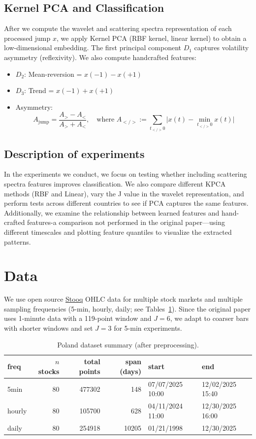 \documentclass[11pt,a4paper]{article}
\begin{document}
\subsection{Kernel PCA and Classification}

After we compute the wavelet and scattering spectra representation of each processed jump $x$, we apply Kernel PCA (RBF kernel, linear kernel) to obtain a low-dimensional embedding. The first principal component $D_1$ captures volatility asymmetry (reflexivity). We also compute handcrafted features:
\begin{itemize}
    \item $D_2$: Mean-reversion = $x(-1) - x(+1)$
    \item $D_3$: Trend = $x(-1) + x(+1)$
    \item Asymmetry: \[
A_{\text{jump}} = \frac{A_> - A_<}{A_> + A_<}, \quad 
\text{where } A_{</>} := \sum_{t_{</>}0} \big| x(t) - \min_{t_{</>}0} x(t) \big|
\]
\end{itemize}

\subsection{Description of experiments}
In the experiments we conduct, we focus on testing whether including scattering spectra features improves classification. We also compare different KPCA methods (RBF and Linear), vary the J value in the wavelet representation, and perform tests across different countries to see if PCA captures the same features.
Additionally, we examine the relationship between learned features and hand-crafted features-a comparison not performed in the original paper—using different timescales and plotting feature quantiles to visualize the extracted patterns.

\section{Data}

We use open source \href{https://stooq.com}{Stooq} OHLC data for multiple stock markets and multiple sampling frequencies (5-min, hourly, daily; see Tables~\ref{tab:data_poland}). Since the original paper uses 1-minute data with a 119-point window and $J=6$, we adapt to coarser bars with shorter windows and set $J=3$ for 5-min experiments.

\begin{table}[t]
\centering
\scriptsize
\setlength{\tabcolsep}{4pt}
\renewcommand{\arraystretch}{1.15}
\begin{tabular}{lrrrll}
\toprule
freq & $n$ stocks & total points & span (days) & start & end \\
\midrule
5min   & 80 & 477302 & 148   & 07/07/2025 10:00 & 12/02/2025 15:40 \\
hourly & 80 & 105700 & 628   & 04/11/2024 11:00 & 12/30/2025 16:00 \\
daily  & 80 & 254918 & 10205 & 01/21/1998       & 12/30/2025 \\
\bottomrule
\end{tabular}
\caption{Poland dataset summary (after preprocessing).}
\label{tab:data_poland}
\end{table}
\end{document}
